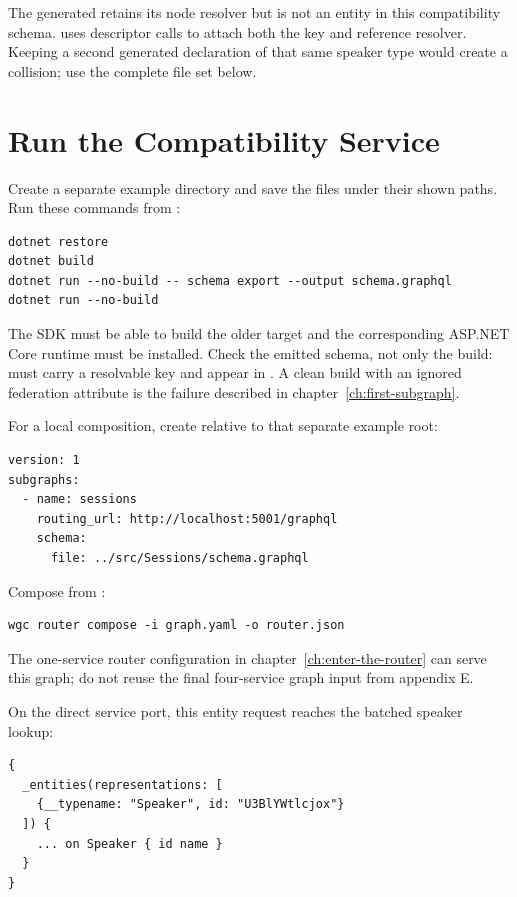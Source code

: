 The generated  retains its node resolver but is not an
entity in this compatibility schema.  uses descriptor
calls to attach both the key and reference resolver. Keeping a second
generated declaration of that same speaker type would create a collision;
use the complete file set below.

\section{Run the Compatibility Service}

Create a separate example directory and save the files under their shown
paths. Run these commands from :

\begin{verbatim}
dotnet restore
dotnet build
dotnet run --no-build -- schema export --output schema.graphql
dotnet run --no-build
\end{verbatim}

The SDK must be able to build the older target and the corresponding ASP.NET
Core runtime must be installed. Check the emitted schema, not only the build:
 must carry a resolvable key and appear in .
A clean build with an ignored federation attribute is the failure described
in chapter~\ref{ch:first-subgraph}.

For a local composition, create  relative to that
separate example root:

\begin{verbatim}
version: 1
subgraphs:
  - name: sessions
    routing_url: http://localhost:5001/graphql
    schema:
      file: ../src/Sessions/schema.graphql
\end{verbatim}

Compose from :

\begin{verbatim}
wgc router compose -i graph.yaml -o router.json
\end{verbatim}

The one-service router configuration in chapter~\ref{ch:enter-the-router} can serve this
graph; do not reuse the final four-service graph input from appendix E.

On the direct service port, this entity request reaches the batched speaker
lookup:

\begin{verbatim}
{
  _entities(representations: [
    {__typename: "Speaker", id: "U3BlYWtlcjox"}
  ]) {
    ... on Speaker { id name }
  }
}
\end{verbatim}

